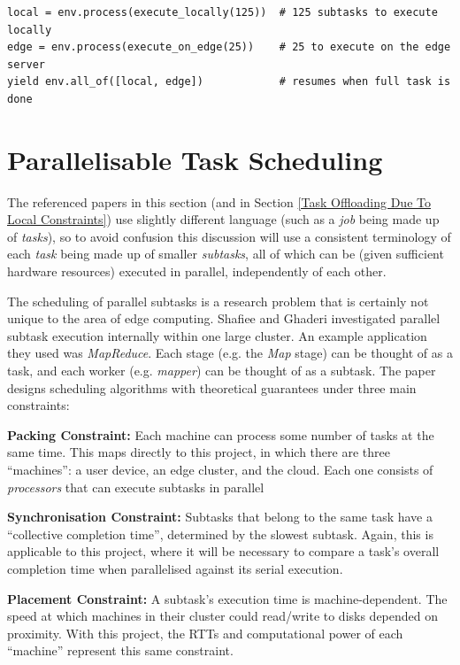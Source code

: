 \documentclass[]{UCD_CS_Interim_Report}
\begin{document}
\begin{verbatim}
local = env.process(execute_locally(125))  # 125 subtasks to execute locally
edge = env.process(execute_on_edge(25))    # 25 to execute on the edge server
yield env.all_of([local, edge])            # resumes when full task is done
\end{verbatim}

\section{Parallelisable Task Scheduling} \label{Parallelisable Task Scheduling}
The referenced papers in this section (and in Section \ref{Task Offloading Due To Local Constraints}) use slightly different language (such as a \textit{job} being made up of \textit{tasks}), so to avoid confusion this discussion will use a consistent terminology of each \textit{task} being made up of smaller \textit{subtasks}, all of which can be (given sufficient hardware resources) executed in parallel, independently of each other.

The scheduling of parallel subtasks is a research problem that is certainly not unique to the area of edge computing. Shafiee and Ghaderi \cite{shafiee2020parallel} investigated parallel subtask execution internally within one large cluster. An example application they used was \textit{MapReduce}. Each stage (e.g. the \textit{Map} stage) can be thought of as a task, and each worker (e.g. \textit{mapper}) can be thought of as a subtask. The paper designs scheduling algorithms with theoretical guarantees under three main constraints:

\textbf{Packing Constraint:} Each machine can process some number of tasks at the same time. This maps directly to this project, in which there are three \enquote{machines}: a user device, an edge cluster, and the cloud. Each one consists of \textit{processors} that can execute subtasks in parallel

\textbf{Synchronisation Constraint:} Subtasks that belong to the same task have a \enquote{collective completion time}, determined by the slowest subtask. Again, this is applicable to this project, where it will be necessary to compare a task's overall completion time when parallelised against its serial execution.

\textbf{Placement Constraint:} A subtask's execution time is machine-dependent. The speed at which machines in their cluster could read/write to disks depended on proximity. With this project, the RTTs and computational power of each \enquote{machine} represent this same constraint.
\end{document}
